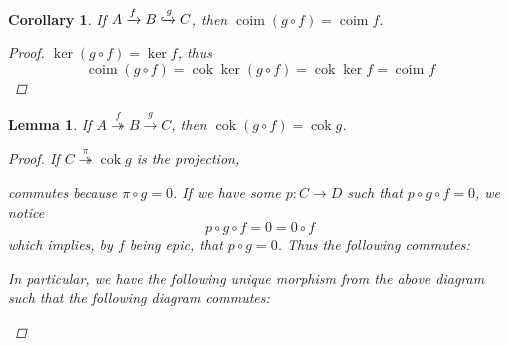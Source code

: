 \documentclass{article}
\DeclareMathOperator{\coim}{coim}
\DeclareMathOperator{\cok}{cok}
\newtheorem{corollary}{Corollary}[theorem]
\newtheorem{lemma}[theorem]{Lemma}
\begin{document}
\begin{corollary}\label{cor:comp with monic and coim}
        If $A\xrightarrow{f}B \xhookrightarrow{g} C$, then $\coim (g\circ f)=\coim f$.
        \begin{proof}
            $\ker (g\circ f)=\ker f$, thus 
            \[
            \coim (g\circ f)=\cok \ker (g\circ f)=\cok \ker f=\coim f
            \]
        \end{proof}
    \end{corollary}
\begin{lemma}\label{lem:comp with epic and cok}
    If $A\overset{f}\twoheadrightarrow B\xrightarrow{g}C$, then $\cok (g\circ f)=\cok g$.
    \begin{proof}
        If $C\overset{\pi}\twoheadrightarrow \cok g$ is the projection, 
        \begin{center}
        \end{center}
        commutes because $\pi \circ g=0$. If we have some $p:C\to D$ such that $p\circ g\circ f=0$, we notice
        \[
        p\circ g\circ f=0=0 \circ f
        \]
        which implies, by $f$ being epic, that $p\circ g=0$. Thus the following commutes:
        \begin{center}
        \end{center}
        In particular, we have the following unique morphism from the above diagram such that the following diagram commutes:
        \begin{center}
        \end{center}
    \end{proof}
\end{lemma}
    
\end{document}
